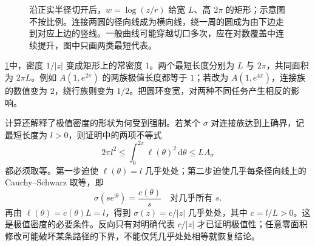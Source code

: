 \begin{figure}[htbp]
\centering
{}
\caption[圆环两族与对数矩形]{沿正实半径切开后，\(w=\log(z/r)\) 给宽 \(L\)、高 \(2\pi\) 的矩形；示意图不按比例。连接两圆的径向线成为横向线，绕一周的圆成为由下边走到对应上边的竖线。一般曲线可能穿越切口多次，应在对数覆盖中连续提升，图中只画两类最短代表。}
\label{b3:fig:08-annulus-log-rectangle}
\end{figure}

\cref{b3:fig:08-annulus-log-rectangle}中，密度 \(1/|z|\) 变成矩形上的常密度 \(1\)。两个最短长度分别为 \(L\) 与 \(2\pi\)，共同面积为 \(2\pi L\)。例如 \(A(1,e^{2\pi})\) 的两族极值长度都等于 \(1\)；若改为 \(A(1,e^{4\pi})\)，连接族的数值变为 \(2\)，绕行族则变为 \(1/2\)。把圆环变宽，对两种不同任务产生相反的影响。

\ProseParagraphBreak
计算还解释了极值密度的形状为何受到强制。若某个 \(\sigma\) 对连接族达到上确界，记最短长度为 \(l>0\)，则证明中的两项不等式
\[
 2\pi l^2\le\int_0^{2\pi}\ell(\theta)^2\,\mathrm d\theta
 \le L A_\sigma
\]
都必须取等。第一步迫使 \(\ell(\theta)=l\) 几乎处处；第二步迫使几乎每条径向线上的 Cauchy--Schwarz 取等，即
\[
 \sigma(se^{\mathrm i\theta})=\frac{c(\theta)}s
 \quad\text{对几乎所有 }s.
\]
再由 \(\ell(\theta)=c(\theta)L=l\)，得到 \(\sigma(z)=c/|z|\) 几乎处处，其中 \(c=l/L>0\)。这是极值密度的必要条件。反向只有对明确代表 \(c/|z|\) 才已证明极值性；任意零面积修改可能破坏某条路径的下界，不能仅凭几乎处处相等就恢复结论。

